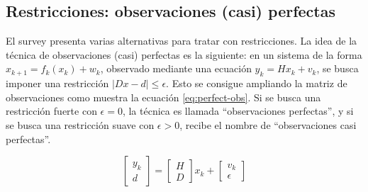 


\subsection{Restricciones: observaciones (casi) perfectas} \label{casiperfect}

El survey \cite{Simon2010} presenta varias alternativas para tratar con restricciones. La idea de la técnica de observaciones (casi) perfectas es la siguiente: en un sistema de la forma \(x_{k+1} = f_k(x_k) + w_k\), observado mediante una ecuación \(y_k = Hx_k + v_k \), se busca imponer una restricción \(|Dx - d| \leq \epsilon\). Esto se consigue ampliando la matriz de observaciones como muestra la ecuación \ref{eq:perfect-obs}. Si se busca una restricción fuerte con \(\epsilon = 0\), la técnica es llamada ``observaciones perfectas'', y si se busca una restricción suave con \(\epsilon > 0\), recibe el nombre de ``observaciones casi perfectas''.


\begin{equation}\label{eq:perfect-obs}
\begin{bmatrix}
y_k \\
d 
\end{bmatrix} = 
\begin{bmatrix}
H \\
D
\end{bmatrix} x_k
+
\begin{bmatrix}
v_k \\
\epsilon  
\end{bmatrix}
\end{equation}










